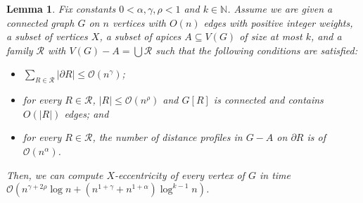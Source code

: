 \documentclass[11pt,a4paper]{article}
\newtheorem{lemma}{Lemma}[section]
\newcommand{\Oh}{\mathcal{O}}
\renewcommand{\leq}{\leqslant}
\renewcommand{\setminus}{-}
\begin{document}
\begin{lemma}\label{l:main_ecc}
Fix constants $0 < \alpha, \gamma, \rho < 1$ and $k \in \mathbb{N}$. Assume we are given a connected graph $G$ on $n$ vertices with $O(n)$ edges with positive integer weights, a subset of vertices $X$, a subset of apices $A \subseteq V(G)$ of size at most $k$, and a family $\mathcal{R}$ with $V(G) \setminus A = \bigcup \mathcal{R} $ such that the following conditions are satisfied:
\begin{itemize}[nosep]
	\item $\sum_{R \in \mathcal{R}} |\partial R| \leq \Oh(n^\gamma)$;
	\item for every $R \in \mathcal{R}$, $|R| \leq \Oh(n^\rho)$ and $G[R]$ is connected and contains $O(|R|)$ edges; and
	\item for every $R \in \mathcal{R}$, the number of distance profiles in $G-A$ on $\partial R$ is of $\Oh(n^\alpha)$.
\end{itemize}
Then, we can compute $X$-eccentricity of every vertex of $G$ in time $\Oh(n^{\gamma + 2\rho} \log n + (n^{1 + \gamma} + n^{1 + \alpha}) \log^{k - 1} n)$.
\end{lemma}
\end{document}
